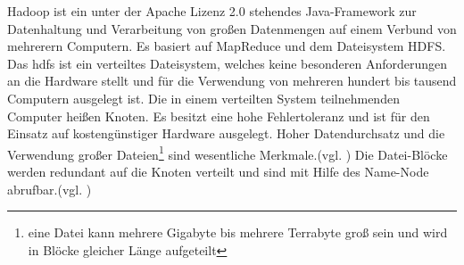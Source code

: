 Hadoop ist ein unter der Apache Lizenz 2.0 stehendes Java-Framework zur Datenhaltung und Verarbeitung von großen Datenmengen auf einem Verbund von mehrerern Computern.
Es basiert auf MapReduce und dem Dateisystem HDFS.\\
Das \Gls{hdfs} ist ein verteiltes Dateisystem, welches keine besonderen Anforderungen an die Hardware stellt und für die Verwendung von mehreren hundert bis tausend Computern ausgelegt ist.
Die in einem verteilten System teilnehmenden Computer heißen Knoten.
Es besitzt eine hohe Fehlertoleranz und ist für den Einsatz auf kostengünstiger Hardware ausgelegt.
Hoher Datendurchsatz und die Verwendung großer Dateien\footnote{eine Datei kann mehrere Gigabyte bis mehrere Terrabyte groß sein und wird in Blöcke gleicher Länge aufgeteilt} sind wesentliche Merkmale.(vgl. \cite[S.3]{paper:hadoop})
Die Datei-Blöcke werden redundant auf die Knoten verteilt und sind mit Hilfe des Name-Node abrufbar.(vgl. \cite[S.7]{ba:dan})

